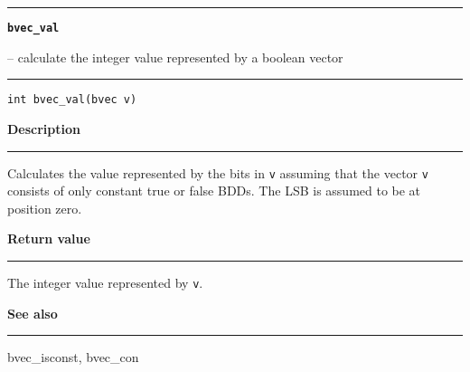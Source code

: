 \begin{minipage}{\textwidth}

\noindent\begin{minipage}{\textwidth}
\rule{\textwidth}{0.5mm}
{\tt\bf bvec\_val }
\--- calculate the integer value represented by a boolean vector  \hspace{\fill}
\\\rule[1.5ex]{\textwidth}{0.5mm}
\end{minipage}

\noindent\begin{verbatim}
int bvec_val(bvec v) 
\end{verbatim}

\vspace{\parsep}\noindent
{\bf Description}\\\rule[1.5ex]{\textwidth}{0.2mm}\vspace{-1.5ex}\setlength{\parindent}{1em}
Calculates the value represented by the bits in {\tt v} assuming
           that the vector {\tt v} consists of only constant true
           or false BDDs. The LSB is assumed to be at position zero. 

\setlength{\parindent}{0em}\vspace{\parsep}\vspace{\baselineskip}\noindent
{\bf Return value}\\\rule[1.5ex]{\textwidth}{0.2mm}\vspace{-1.5ex}
The integer value represented by {\tt v}. 

\vspace{\parsep}\vspace{\baselineskip}\noindent
{\bf See also}\\\rule[1.5ex]{\textwidth}{0.2mm}\vspace{-1.5ex}
bvec\_isconst, bvec\_con 
\end{minipage}
\vspace{8ex}

